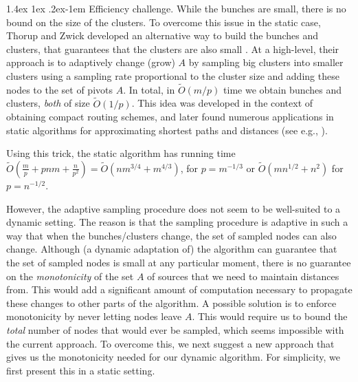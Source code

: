 \documentclass[11pt]{article}
\makeatletter
\theoremstyle{definition}
\theoremstyle{remark}
\newcommand{\mtodo}[1]{\todo[color=red!20]{M: #1}}
\renewcommand{\paragraph}{%
  \@startsection{paragraph}{4}%
  {\z@}{1.4ex \@plus 1ex \@minus .2ex}{-1em}%
  {\normalfont\normalsize\bfseries}%
}
\makeatother
\begin{document}
\paragraph{Efficiency challenge.}
While the bunches are small, there is no bound on the size of the clusters. To overcome this issue in the static case, Thorup and Zwick developed an alternative way to build the bunches and clusters, that guarantees that the clusters are also small \cite{TZ01}. At a high-level, their approach is to adaptively change (grow) $A$ by sampling big clusters into smaller clusters using a sampling rate proportional to the cluster size and adding these nodes to the set of pivots $A$. In total, in $\tilde O(m/p)$ time we obtain bunches and clusters, \emph{both} of size $\tilde O(1/p)$.
This idea was developed in the context of obtaining compact routing schemes, and later found numerous applications in static algorithms for approximating shortest paths and distances (see e.g., \cite{BaswanaK10,AkavR20,backurs2021toward,AkavR21}).

Using this trick, the static algorithm has running time $\tilde {O}(\tfrac{m}{p}+pnm+\tfrac{n}{p^2})=\tilde O(nm^{3/4}+m^{4/3})$, for $p=m^{-1/3}$ or $\tilde O(mn^{1/2}+n^2)$ for $p=n^{-1/2}$. 


However, the adaptive sampling procedure does not seem to be well-suited to a dynamic setting. The reason is that the sampling procedure is adaptive in such a way that when the bunches/clusters change, the set of sampled nodes can also change. Although (a dynamic adaptation of) the algorithm can guarantee that the set of sampled nodes is small at any particular moment, there is no guarantee on the \emph{monotonicity} of the set $A$ of sources that we need to maintain distances from. This would add a significant amount of computation necessary to propagate these changes to other parts of the algorithm. A possible solution is to enforce monotonicity by never letting nodes leave $A$. This would require us to bound the \emph{total} number of nodes that would ever be sampled, which seems impossible with the current approach. 
To overcome this, we next suggest a new approach that gives us the monotonicity needed for our dynamic algorithm. For simplicity, we first present this in a static setting. 


\end{document}
